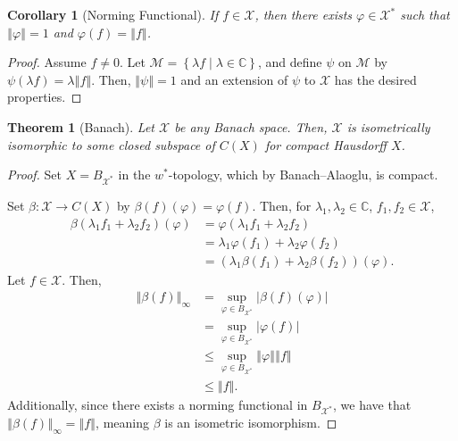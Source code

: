 \documentclass[10pt]{extarticle}
\newcommand{\C}{\mathbb{C}}
\newcommand{\norm}[1]{\left\Vert #1\right\Vert}
\newcommand{\set}[1]{\left\{#1\right\}}
\theoremstyle{plain}
\newtheorem*{theorem}{Theorem}
\newtheorem*{corollary}{Corollary}
\theoremstyle{definition}
\theoremstyle{note}
\renewcommand{\newline}{\hfill\break}
\begin{document}
\begin{corollary}[Norming Functional]
  If $f\in \mathcal{X}$, then there exists $\varphi \in \mathcal{X}^{\ast}$ such that $\norm{\varphi} = 1$ and $\varphi(f) = \norm{f}$.
\end{corollary}
\begin{proof}
  Assume $f\neq 0$. Let $\mathcal{M} = \set{\lambda f\mid \lambda \in \C}$, and define $\psi$ on $\mathcal{M}$ by $\psi(\lambda f) = \lambda \norm{f}$. Then, $\norm{\psi} = 1$ and an extension of $\psi$ to $\mathcal{X}$ has the desired properties.
\end{proof}
\begin{theorem}[Banach]
  Let $\mathcal{X}$ be any Banach space. Then, $\mathcal{X}$ is isometrically isomorphic to some closed subspace of $C(X)$ for compact Hausdorff $X$.
\end{theorem}
\begin{proof}
  Set $X = B_{\mathcal{X}^{\ast}}$ in the $w^{\ast}$-topology, which by Banach--Alaoglu, is compact.\newline

  Set $\beta: \mathcal{X}\rightarrow C(X)$ by $\beta(f)(\varphi) = \varphi(f)$. Then, for $\lambda_1,\lambda_2\in \C$, $f_1,f_2\in \mathcal{X}$,
  \begin{align*}
    \beta\left(\lambda_1f_1 + \lambda_2f_2\right)(\varphi) &= \varphi\left(\lambda_1 f_1 + \lambda_2f_2\right)\\
                                                           &= \lambda_1 \varphi(f_1) + \lambda_2\varphi\left(f_2\right)\\
                                                           &= \left(\lambda_1\beta\left(f_1\right) + \lambda_2\beta\left(f_2\right)\right)\left(\varphi\right).
  \end{align*}
  Let $f\in \mathcal{X}$. Then,
  \begin{align*}
    \norm{\beta(f)}_{\infty} &= \sup_{\varphi \in B_{\mathcal{X}^{\ast}}} \left\vert \beta(f)(\varphi) \right\vert\\
                             &= \sup_{\varphi \in B_{\mathcal{X}^{\ast}}}\left\vert \varphi(f) \right\vert\\
                             &\leq \sup_{\varphi \in B_{\mathcal{X}^{\ast}}}\norm{\varphi}\norm{f}\\
                             &\leq \norm{f}.
  \end{align*}
  Additionally, since there exists a norming functional in $B_{\mathcal{X}^{\ast}}$, we have that $\norm{\beta(f)}_{\infty} = \norm{f}$, meaning $\beta$ is an isometric isomorphism.
\end{proof}
\end{document}
